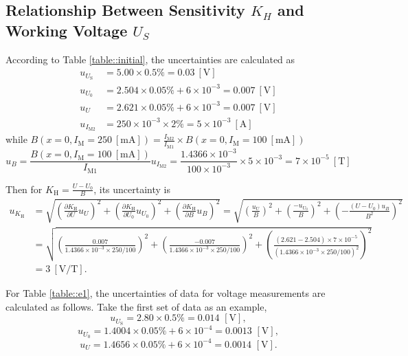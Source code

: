 \documentclass[a4paper]{article}
\begin{document}
\subsection{Relationship Between Sensitivity $K_H$ and Working Voltage $U_S$}
According to Table \ref{table::initial}, the uncertainties are calculated as
\begin{align*}
	u_{U_\text{S}}  & = 5.00\times 0.5\% = 0.03\ [\text{V}]                          \\
	u_{U_0}         & = 2.504\times0.05\%+6\times10^{-3} = 0.007\ [\text{V}]         \\
	u_U             & = 2.621\times0.05\%+6\times10^{-3} = 0.007\ [\text{V}]         \\
	u_{I_\text{M2}} & = 250 \times 10^{-3} \times 2\% = 5 \times 10^{-3}\ [\text{A}]
\end{align*}
while $B(x=0,I_\text{M}=250\ [\text{mA}]) = \frac{I_\text{M2}}{I_{\text{M1}}} \times B(x=0,I_\text{M}=100\ [\text{mA}])$
\begin{equation*}
	u_B = \frac{B(x=0,I_\text{M}=100\ [\text{mA}])}{I_{\text{M1}}}u_{I_\text{M2}} = \frac{1.4366\times 10^{-3}}{100\times 10^{-3}} \times 5\times 10^{-3} = 7 \times 10^{-5}\ [\text{T}]
\end{equation*}
\par Then for $K_\text{H} = \frac{U-U_0}{B}$, its uncertainty is
\begin{align*}
	u_{K_\text{H}} & = \sqrt{(\frac{\partial K_\text{H}}{\partial U}u_U)^2+(\frac{\partial K_\text{H}}{\partial U_0}u_{U_0})^2+(\frac{\partial K_\text{H}}{\partial B}u_B)^2} = \sqrt{(\frac{u_U}{B})^2+(\frac{-u_{U_0}}{B})^2+(-\frac{(U-U_0)u_B}{B^2})^2} \\
	               & =\sqrt{(\frac{0.007}{1.4366\times10^{-3}\times250/100})^2+(\frac{-0.007}{1.4366\times10^{-3}\times250/100})^2+(\frac{(2.621-2.504)\times 7\times 10^{-5}}{(1.4366\times10^{-3}\times250/100)^2})^2}                                    \\
	               & =3\ [\text{V}/\text{T}].
\end{align*}

For Table \ref{table::e1}, the uncertainties of data for voltage measurements are calculated as follows. Take the first set of data as an example,
$$u_{U_\text{S}} = 2.80\times 0.5\% = 0.014\,\,[\text{V}],$$
$$u_{U_0} = 1.4004\times0.05\%+6\times10^{-4} = 0.0013\,\,[\text{V}],$$
$$u_U = 1.4656\times0.05\%+6\times10^{-4} = 0.0014\,\,[\text{V}].$$
\end{document}
